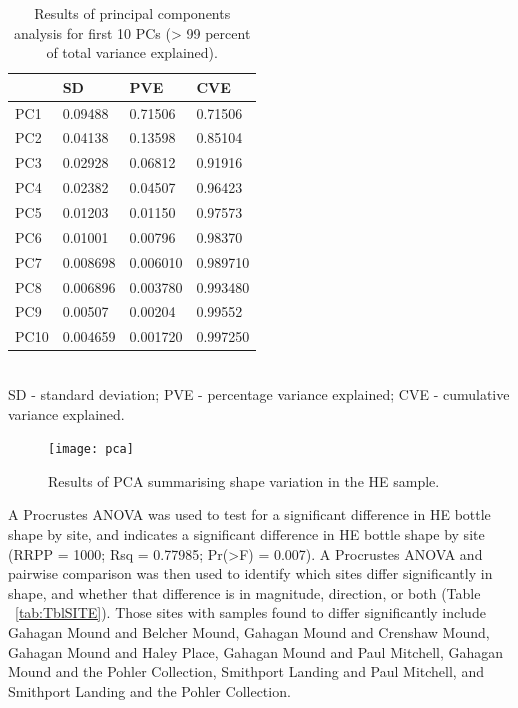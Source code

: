 \documentclass[review]{elsarticle}
\begin{document}
\begin{table}[htbp]\centering
\footnotesize
\caption{Results of principal components analysis for first 10 PCs (> 99 percent of total variance explained).}
\centering
\begin{tabular}{lp{2cm}p{2cm}p{2cm}}
\toprule
 & SD & PVE & CVE\\
\midrule
PC1 & 0.09488 & 0.71506 & 0.71506\\
PC2 & 0.04138 & 0.13598 & 0.85104\\
PC3 & 0.02928 & 0.06812 & 0.91916\\
PC4 & 0.02382 & 0.04507 & 0.96423\\
PC5 & 0.01203 & 0.01150 & 0.97573\\
PC6 & 0.01001 & 0.00796 & 0.98370\\
PC7 & 0.008698 & 0.006010 & 0.989710\\
PC8 & 0.006896 & 0.003780 & 0.993480\\
PC9 & 0.00507 & 0.00204 & 0.99552\\
PC10 & 0.004659 & 0.001720 & 0.997250\\
\bottomrule
\end{tabular}
\smallskip\\
SD - standard deviation; PVE - percentage variance explained; CVE - cumulative variance explained.
\label{tab:Tblpca1}
\end{table}

\begin{figure}[htbp]\centering
\texttt{[image: pca]}
\caption{Results of PCA summarising shape variation in the HE sample.}
\label{fig:FigPCA}
\end{figure}

A Procrustes ANOVA was used to test for a significant difference in HE bottle shape by site, and indicates a significant difference in HE bottle shape by site (RRPP = 1000; Rsq = 0.77985; Pr(>F) = 0.007). A Procrustes ANOVA and pairwise comparison was then used to identify which sites differ significantly in shape, and whether that difference is in magnitude, direction, or both (Table ~\ref{tab:TblSITE}). Those sites with samples found to differ significantly include Gahagan Mound and Belcher Mound, Gahagan Mound and Crenshaw Mound, Gahagan Mound and Haley Place, Gahagan Mound and Paul Mitchell, Gahagan Mound and the Pohler Collection, Smithport Landing and Paul Mitchell, and Smithport Landing and the Pohler Collection. 
\end{document}
